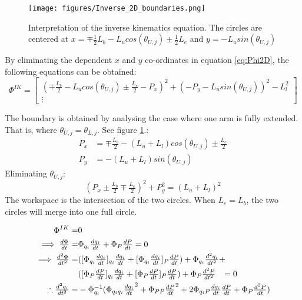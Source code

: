 \begin{figure}[h!]
	\centering
	\texttt{[image: figures/Inverse\_2D\_boundaries.png]}                                                     
	\caption[Interpretation of the inverse kinematics equation]{Interpretation of the inverse kinematics equation. The circles are centered at $x=\mp\tfrac{1}{2}L_b-L_u cos(\theta_{U,j})\pm\tfrac{1}{2}L_e$  and $y=-L_u sin(\theta_{U,j})$}
	\label{fig:inverse2D}
\end{figure}

By eliminating the dependent $x$ and $y$ co-ordinates in equation \ref{eq:Phi2D}, the following equations can be obtained:
\begin{equation}
    \Phi^{IK}=
    \begin{bmatrix}
     (\mp \frac{L_b}{2}-L_u cos(\theta_{U,j})\pm\frac{L_e}{2}-P_x)^2+(-P_y-L_u sin(\theta_{U,j}))^2-L_l^2 \\
         \vdots
    \end{bmatrix}
\end{equation}


The boundary is obtained by analysing the case where one arm is fully extended. That is, where $\theta_{U,j}=\theta_{L,j}$. See figure \ref{fig:inverse2D}.:
\begin{align*}
P_x&=\mp\tfrac{L_b}{2}-(L_u+L_l)cos(\theta_{U,j})\pm\tfrac{L_e}{2} \\
P_y&=-(L_u+L_l)sin(\theta_{U,j})
\end{align*}
Eliminating $\theta_{U,j}$:
\begin{equation}
(P_x\pm\tfrac{L_b}{2}\mp\tfrac{L_e}{2})^2+P_y^2=(L_u+L_l)^2
\end{equation}
The workspace is the intersection of the two circles. When $L_e=L_b$, the two circles will merge into one full circle.

\begin{align}
\Phi^{IK} =& 0  \nonumber \\
\implies \tfrac{d\Phi}{dt} =&\Phi_{q_i} \tfrac{dq_i}{dt}+\Phi_{P} \tfrac{dP}{dt}  =0\\
\implies 
\tfrac{d^2\Phi}{dt^2} =&([\Phi_{q_i}\tfrac{dq_i}{dt}]_{q_i}\tfrac{dq_i}{dt}+[\Phi_{q_i}\tfrac{dq_i}{dt}]_{P}\tfrac{dP}{dt})+\Phi_{q_i}\tfrac{d^2q_i}{dt^2}+ \nonumber\\
                           &([\Phi_{P}\tfrac{dP}{dt}]_{q_i}\tfrac{dq_i}{dt}+[\Phi_{P}\tfrac{dP}{dt}]_{P}\tfrac{dP}{dt})+\Phi_{P}\tfrac{d^2P}{dt^2}\hphantom{+}=0\\
\therefore  \tfrac{d^2q_i}{dt^2}=&-\Phi_{q_i}^{-1} (\Phi_{q_iq_i}\tfrac{dq_i}{dt}^2+\Phi_{PP}\tfrac{dP}{dt}^2+2\Phi_{q_iP}\tfrac{dq_i}{dt}\tfrac{dP}{dt}+\Phi_P\tfrac{d^2P}{dt}) \label{eq:gammaIK}
\end{align}

